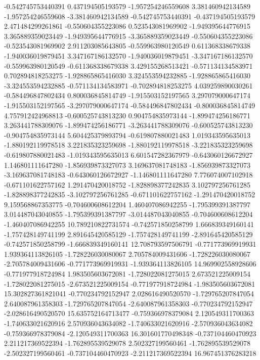 {-0.542745753440391	0.437194505193579	-1.957254246559608	3.381460942134589	-1.957254246559608	-3.381460942134589	-0.542745753440391	-0.437194505193579	2.471484299261861
-0.550604355223086	0.523543081969902	-1.949395644776915	3.365889359023449	-1.949395644776915	-3.365889359023449	-0.550604355223086	-0.523543081969902	2.911203085643805
-0.559963980120549	0.611368338679338	-1.940036019879451	3.347167186132570	-1.940036019879451	-3.347167186132570	-0.559963980120549	-0.611368338679338	3.429155268513421
-0.571134134583971	0.702894818253275	-1.928865865416030	3.324553594232885	-1.928865865416030	-3.324553594232885	-0.571134134583971	-0.702894818253275	4.039259890030261
-0.584496847802434	0.800036845814749	-1.915503152197565	3.297079000647174	-1.915503152197565	-3.297079000647174	-0.584496847802434	-0.800036845814749	4.757912424968813
-0.600525743813230	0.904754835973144	-1.899474256186771	3.263441788309076	-1.899474256186771	-3.263441788309076	-0.600525743813230	-0.904754835973144	5.604425379893794
-0.619807880021483	1.019343595635013	-1.880192119978518	3.221835323259698	-1.880192119978518	-3.221835323259698	-0.619807880021483	-1.019343595635013	6.601547282367979
-0.643060126672927	1.146801111647280	-1.856939873327073	3.169637081748183	-1.856939873327073	-3.169637081748183	-0.643060126672927	-1.146801111647280	7.776074007102918
-0.671101622757162	1.291470420018752	-1.828898377242835	3.102797256761285	-1.828898377242835	-3.102797256761285	-0.671101622757162	-1.291470420018752	9.159568867353775
-0.704600608612204	1.460407086942255	-1.795399391387797	3.014487043040855	-1.795399391387797	-3.014487043040855	-0.704600608612204	-1.460407086942255	10.789210822731574
-0.742571850258799	1.666839349160141	-1.757428149741199	2.891645420585129	-1.757428149741199	-2.891645420585129	-0.742571850258799	-1.666839349160141	12.708793597506791
-0.771773969919931	1.939364113826105	-1.728226030080067	2.705784009431606	-1.728226030080067	-2.705784009431606	-0.771773969919931	-1.939364113826105	14.969902558928606
-0.771977918724984	1.983505603672081	-1.728022081275015	2.673521225009154	-1.728022081275015	-2.673521225009154	-0.771977918724984	-1.983505603672081	15.302827361821041
-0.770234792152947	2.028616490520570	-1.729765207847054	2.640087961358303	-1.729765207847054	-2.640087961358303	-0.770234792152947	-2.028616490520570	15.635752164713477
-0.759366978379084	2.120549311700363	-1.740633021620916	2.570936043634082	-1.740633021620916	-2.570936043634082	-0.759366978379084	-2.120549311700363	16.301601770498348
-0.737104460470923	2.211217369522394	-1.762895539529078	2.502327199560461	-1.762895539529078	-2.502327199560461	-0.737104460470923	-2.211217369522394	16.967451376283218
}
